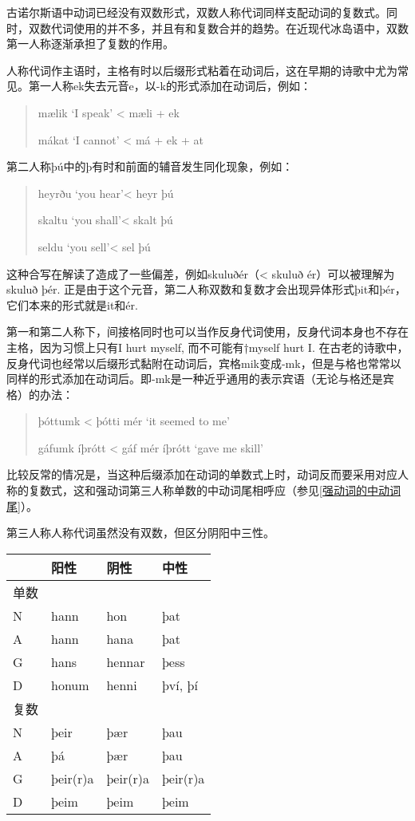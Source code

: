 古诺尔斯语中动词已经没有双数形式，双数人称代词同样支配动词的复数式。同时，双数代词使用的并不多，并且有和复数合并的趋势。在近现代冰岛语中，双数第一人称逐渐承担了复数的作用。

人称代词作主语时，主格有时以后缀形式粘着在动词后，这在早期的诗歌中尤为常见。第一人称ek失去元音e，以-k的形式添加在动词后，例如：

\begin{quote}
  mælik `I speak‌' \textless{} mæli + ek

  mákat `I cannot‌' \textless{} má + ek + at
\end{quote}

第二人称þú中的þ有时和前面的辅音发生同化现象，例如：

\begin{quote}
  heyrðu `you hear'\textless{} heyr þú

  skaltu `you shall'\textless{} skalt þú

  seldu `you sell'\textless{} sel þú
\end{quote}

这种合写在解读了造成了一些偏差，例如skuluðér（\textless{} skuluð
ér）可以被理解为skuluð þér.
正是由于这个元音，第二人称双数和复数才会出现异体形式þit和þér，它们本来的形式就是it和ér.

第一和第二人称下，间接格同时也可以当作反身代词使用，反身代词本身也不存在主格，因为习惯上只有I
hurt myself, 而不可能有†myself hurt I.
在古老的诗歌中，反身代词也经常以后缀形式黏附在动词后，宾格mik变成-mk，但是与格也常常以同样的形式添加在动词后。即-mk是一种近乎通用的表示宾语（无论与格还是宾格）的办法：

\begin{quote}
  þóttumk \textless{} þótti mér `it seemed to me‌'

  gáfumk íþrótt \textless{} gáf mér íþrótt `gave me skill'
\end{quote}

比较反常的情况是，当这种后缀添加在动词的单数式上时，动词反而要采用对应人称的复数式，这和强动词第三人称单数的中动词尾相呼应（参见\ref{强动词的中动词尾}）。

第三人称人称代词虽然没有双数，但区分阴阳中三性。

\begin{longtable}{llll}
  \toprule
       & 阳性     & 阴性     & 中性     \\
  \midrule
  \endhead
  \bottomrule
  \endfoot
  单数 &          &          &          \\
  N    & hann     & hon      & þat      \\
  A    & hann     & hana     & þat      \\
  G    & hans     & hennar   & þess     \\
  D    & honum    & henni    & því, þí  \\
  复数 &          &          &          \\
  N    & þeir     & þær      & þau      \\
  A    & þá       & þær      & þau      \\
  G    & þeir(r)a & þeir(r)a & þeir(r)a \\
  D    & þeim     & þeim     & þeim     \\
\end{longtable}

